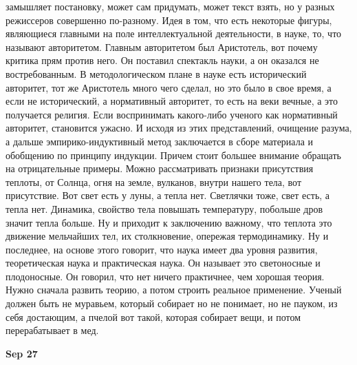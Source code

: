 \documentclass[a4paper, 12pt]{article}
\begin{document}
замышляет постановку, может сам придумать, может текст взять, но 
у разных режиссеров совершенно по-разному. Идея в том, что есть 
некоторые фигуры, являющиеся главными на поле интеллектуальной 
деятельности, в науке, то, что называют авторитетом. Главным авторитетом 
был Аристотель, вот почему критика прям против него. Он поставил 
спектакль науки, а он оказался не востребованным. В методологическом 
плане в науке есть исторический авторитет, тот же Аристотель много чего 
сделал, но это было в свое время, а если не исторический, а нормативный 
авторитет, то есть на веки вечные, а это получается религия. Если 
воспринимать какого-либо ученого как нормативный авторитет, становится 
ужасно. И исходя из этих представлений, очищение разума, а дальше 
эмпирико-индуктивный метод заключается в сборе материала и обобщению по 
принципу индукции. Причем стоит большее внимание обращать на 
отрицательные примеры. Можно рассматривать признаки присутствия теплоты, 
от Солнца, огня на земле, вулканов, внутри нашего тела, вот присутствие. 
Вот свет есть у луны, а тепла нет. Светлячки тоже, свет есть, а тепла 
нет. Динамика, свойство тела повышать температуру, побольше дров значит 
тепла больше. Ну и приходит к заключению важному, что теплота это 
движение мельчайших тел, их столкновение, опережая термодинамику. Ну 
и последнее, на основе этого говорит, что наука имеет два уровня 
развития, теоретическая наука и практическая наука. Он называет это 
светоносные и плодоносные. Он говорил, что нет ничего практичнее, чем 
хорошая теория. Нужно сначала развить теорию, а потом строить реальное 
применение. Ученый должен быть не муравьем, который собирает но не 
понимает, но не пауком, из себя достающим, а пчелой вот такой, которая 
собирает вещи, и потом перерабатывает в мед.

\hfill \textbf{Sep 27}
\end{document}
